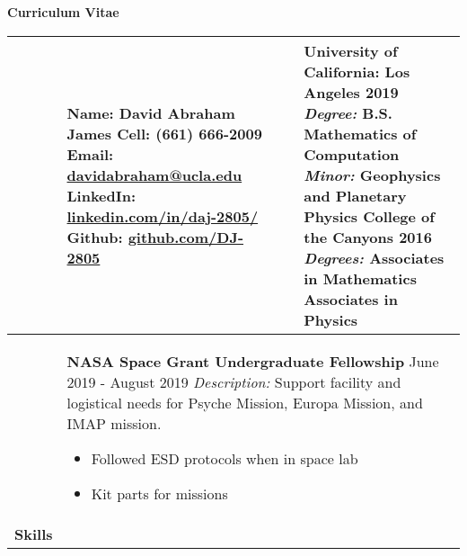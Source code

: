 \documentclass[10pt]{article}
\newcommand*\leftright[2]{%
  \leavevmode
  \rlap{#1}%
  \hspace{0.5\linewidth}%
  #2}
\begin{document}
{\centering
    \textbf{\large Curriculum Vitae} \\
}
\begin{longtable}{l l l l} \hline
    \multicolumn{1}{p{1.7 cm}}{\textbf{\vspace{Contact Info.}}}    &    
    
        \multicolumn{1}{p{7cm}}{
        \textbf{Name:} David Abraham James \newline
        \textbf{Cell: } (661) 666-2009 \newline
        \textbf{Email: } \href{mailto:davidabraham@ucla.edu}{davidabraham@ucla.edu} \newline
        \textbf{LinkedIn: } \href{https://www.linkedin.com/in/daj-2805/}{linkedin.com/in/daj-2805/} \newline
        \textbf{Github: } \href{https://github.com/DJ-2805}{github.com/DJ-2805} } &
        \multicolumn{1}{p{1.5cm}}{\textbf{\vspace{Education}}}  &
            \multicolumn{1}{p{7.4cm}}{
            \textbf{University of California: Los Angeles 2019} \newline
            \textit{Degree:} B.S. Mathematics of Computation \newline
            \textit{Minor:} Geophysics and Planetary Physics \newline
            \textbf{College of the Canyons 2016} \newline
            \textit{Degrees:} Associates in Mathematics \newline 
            Associates in Physics} \\ \hline
        
    \multicolumn{1}{p{1.7 cm}}{\textbf{\vspace{Awards}}}    &                
    
        \multicolumn{3}{p{17cm}}{
        \textbf{NASA Space Grant Undergraduate Fellowship} \newline
        \leftright{\textit{Lab Assistant}}{June 2019 - August 2019} \newline
        \textit{Description:} Support facility and logistical needs for Psyche Mission, Europa Mission, and IMAP mission.
        \begin{itemize}[noitemsep,nolistsep]
            \item Followed ESD protocols when in space lab
            \item Kit parts for missions
        \end{itemize}
       \baselineskip } \\ \hline
    \multicolumn{1}{p{1.7cm}}{\textbf{Skills}}   &
    

\end{longtable}
\end{document}
